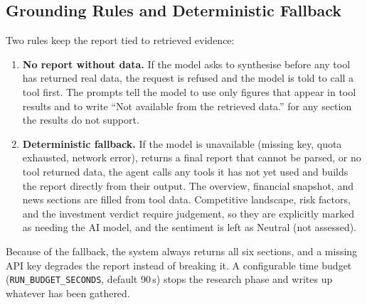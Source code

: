\documentclass[12pt,a4paper,oneside]{report}
\begin{document}
\subsection{Grounding Rules and Deterministic Fallback}
Two rules keep the report tied to retrieved evidence:
\begin{enumerate}[leftmargin=*]
\item \textbf{No report without data.} If the model asks to synthesise before any tool has returned real data, the request is refused and the model is told to call a tool first. The prompts tell the model to use only figures that appear in tool results and to write ``Not available from the retrieved data.'' for any section the results do not support.
\item \textbf{Deterministic fallback.} If the model is unavailable (missing key, quota exhausted, network error), returns a final report that cannot be parsed, or no tool returned data, the agent calls any tools it has not yet used and builds the report directly from their output. The overview, financial snapshot, and news sections are filled from tool data. Competitive landscape, risk factors, and the investment verdict require judgement, so they are explicitly marked as needing the AI model, and the sentiment is left as Neutral (not assessed).
\end{enumerate}
Because of the fallback, the system always returns all six sections, and a missing API key degrades the report instead of breaking it. A configurable time budget (\texttt{RUN\_BUDGET\_SECONDS}, default 90\,s) stops the research phase and writes up whatever has been gathered.
\end{document}
